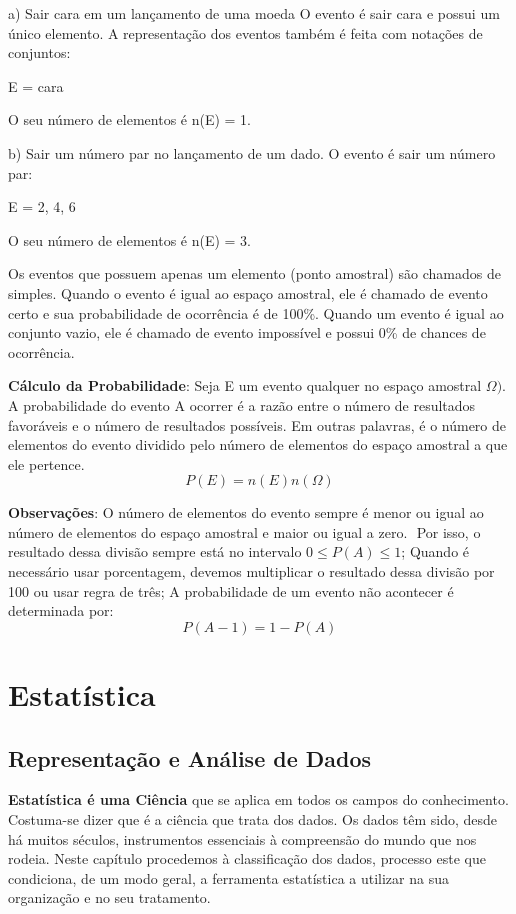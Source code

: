 \begin{multicols*}{2}
	a) Sair cara em um lançamento de uma moeda O evento é sair cara e possui um único elemento. A representação dos eventos também é feita com notações de conjuntos:

	E = {cara}

	O seu número de elementos é n(E) = 1.

	b) Sair um número par no lançamento de um dado. O evento é sair um número par:

	E = {2, 4, 6}

	O seu número de elementos é n(E) = 3.

	Os eventos que possuem apenas um elemento (ponto amostral) são chamados de simples. Quando o evento é igual ao espaço amostral, ele é chamado de evento certo e sua probabilidade de ocorrência é de 100\%. Quando um evento é igual ao conjunto vazio, ele é chamado de evento impossível e possui 0\% de chances de ocorrência.

	\textbf{Cálculo da Probabilidade}: Seja E um evento qualquer no espaço amostral $\Omega)$. A probabilidade do evento A ocorrer é a razão entre o número de resultados favoráveis e o número de resultados possíveis. Em outras palavras, é o número de elementos do evento dividido pelo número de elementos do espaço amostral a que ele pertence.
		\[P(E) = n(E)  n(\Omega)\]

	\textbf{Observações}:  O número de elementos do evento sempre é menor ou igual ao número de elementos do espaço amostral e maior ou igual a zero. $ $ Por isso, o resultado dessa divisão sempre está no intervalo {$0 \leq P(A) \leq 1$}; Quando é necessário usar porcentagem, devemos multiplicar o resultado dessa divisão por 100 ou usar regra de três;
	A probabilidade de um evento não acontecer é determinada por:
	\[P(A-1) = 1  -  P(A)\]

	\section*{Estatística}

	\subsection*{Representação e Análise de Dados}
	\textbf{ Estatística é uma Ciência} que se aplica em todos os campos do conhecimento. Costuma-se dizer que é a ciência que trata dos dados. Os dados têm sido, desde há muitos séculos, instrumentos essenciais à compreensão do mundo que nos rodeia. Neste capítulo procedemos à classificação dos dados, processo este que condiciona, de um modo geral, a ferramenta estatística a utilizar na sua organização e no seu tratamento.


\end{multicols*}
